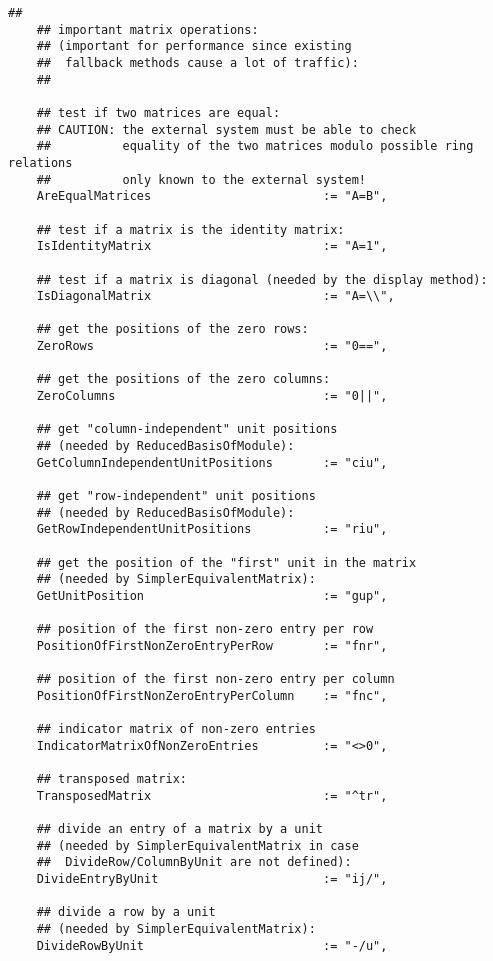 \documentclass[a4paper,11pt]{report}
\begin{document}
{{{\begin{Verbatim}[fontsize=\small,frame=single,label=Code]
    ##
    ## important matrix operations:
    ## (important for performance since existing
    ##  fallback methods cause a lot of traffic):
    ##
    
    ## test if two matrices are equal:
    ## CAUTION: the external system must be able to check
    ##          equality of the two matrices modulo possible ring relations
    ##          only known to the external system!
    AreEqualMatrices                        := "A=B",
    
    ## test if a matrix is the identity matrix:
    IsIdentityMatrix                        := "A=1",
    
    ## test if a matrix is diagonal (needed by the display method):
    IsDiagonalMatrix                        := "A=\\",
    
    ## get the positions of the zero rows:
    ZeroRows                                := "0==",
    
    ## get the positions of the zero columns:
    ZeroColumns                             := "0||",
    
    ## get "column-independent" unit positions
    ## (needed by ReducedBasisOfModule):
    GetColumnIndependentUnitPositions       := "ciu",
    
    ## get "row-independent" unit positions
    ## (needed by ReducedBasisOfModule):
    GetRowIndependentUnitPositions          := "riu",
    
    ## get the position of the "first" unit in the matrix
    ## (needed by SimplerEquivalentMatrix):
    GetUnitPosition                         := "gup",
    
    ## position of the first non-zero entry per row
    PositionOfFirstNonZeroEntryPerRow       := "fnr",
    
    ## position of the first non-zero entry per column
    PositionOfFirstNonZeroEntryPerColumn    := "fnc",
    
    ## indicator matrix of non-zero entries
    IndicatorMatrixOfNonZeroEntries         := "<>0",
    
    ## transposed matrix:
    TransposedMatrix                        := "^tr",
    
    ## divide an entry of a matrix by a unit
    ## (needed by SimplerEquivalentMatrix in case
    ##  DivideRow/ColumnByUnit are not defined):
    DivideEntryByUnit                       := "ij/",
    
    ## divide a row by a unit
    ## (needed by SimplerEquivalentMatrix):
    DivideRowByUnit                         := "-/u",
    

\end{Verbatim}}}}
\end{document}
